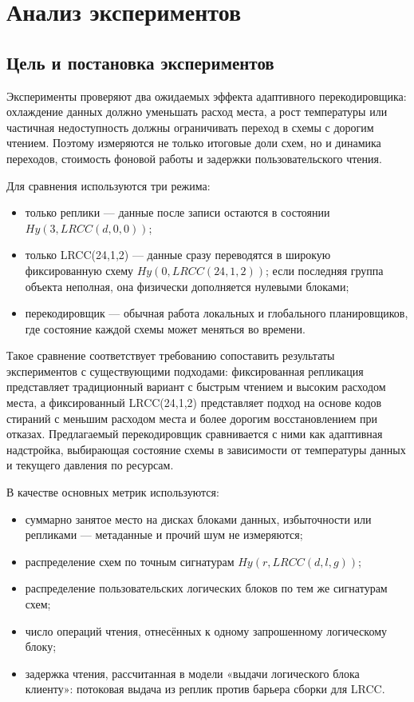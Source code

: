 \section{Анализ экспериментов}
\subsection{Цель и постановка экспериментов}

Эксперименты проверяют два ожидаемых эффекта адаптивного перекодировщика:
охлаждение данных должно уменьшать расход места, а рост температуры или
частичная недоступность должны ограничивать переход в схемы с дорогим чтением.
Поэтому измеряются не только итоговые доли схем, но и динамика переходов,
стоимость фоновой работы и задержки пользовательского чтения.

Для сравнения используются три режима:
\begin{itemize}
    \item только реплики --- данные после записи остаются в состоянии
    \(Hy(3,LRCC(d,0,0))\);
    \item только LRCC(24,1,2) --- данные сразу переводятся в широкую
    фиксированную схему \(Hy(0,LRCC(24,1,2))\); если последняя группа объекта
    неполная, она физически дополняется нулевыми блоками;
    \item перекодировщик --- обычная работа локальных и глобального
    планировщиков, где состояние каждой схемы может меняться во времени.
\end{itemize}

Такое сравнение соответствует требованию сопоставить результаты экспериментов с
существующими подходами: фиксированная репликация представляет традиционный
вариант с быстрым чтением и высоким расходом места, а фиксированный LRCC(24,1,2)
представляет подход на основе кодов стираний с меньшим расходом места и более
дорогим восстановлением при отказах. Предлагаемый перекодировщик сравнивается с
ними как адаптивная надстройка, выбирающая состояние схемы в зависимости от
температуры данных и текущего давления по ресурсам.

В качестве основных метрик используются:
\begin{itemize}
    \item суммарно занятое место на дисках блоками данных, избыточности или
    репликами --- метаданные и прочий шум не измеряются;
    \item распределение схем по точным сигнатурам \(Hy(r,LRCC(d,l,g))\);
    \item распределение пользовательских логических блоков по тем же
    сигнатурам схем;
    \item число операций чтения, отнесённых к одному запрошенному
    логическому блоку;
    \item задержка чтения, рассчитанная в модели «выдачи логического
    блока клиенту»: потоковая выдача из реплик против барьера сборки для LRCC.
\end{itemize}

